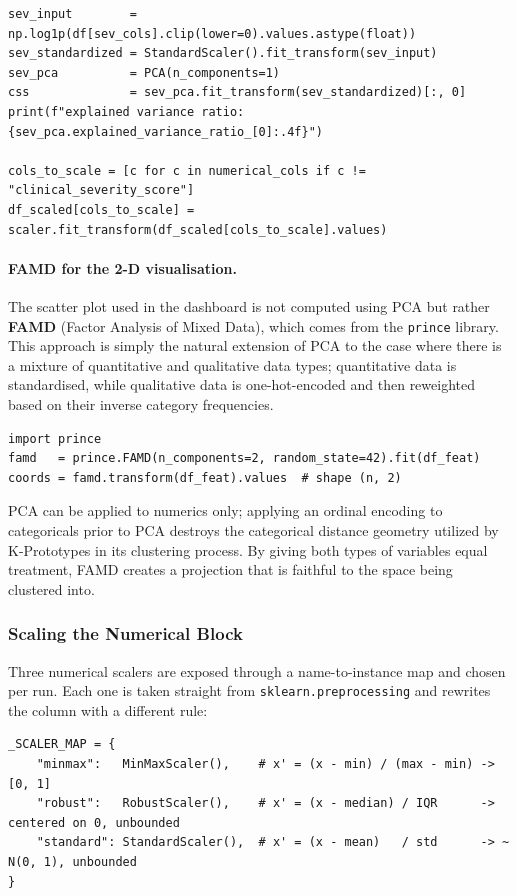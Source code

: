 \begin{lstlisting}[style=pythonstyle]
sev_input        = np.log1p(df[sev_cols].clip(lower=0).values.astype(float))
sev_standardized = StandardScaler().fit_transform(sev_input)
sev_pca          = PCA(n_components=1)
css              = sev_pca.fit_transform(sev_standardized)[:, 0]
print(f"explained variance ratio: {sev_pca.explained_variance_ratio_[0]:.4f}")

cols_to_scale = [c for c in numerical_cols if c != "clinical_severity_score"]
df_scaled[cols_to_scale] = scaler.fit_transform(df_scaled[cols_to_scale].values)
\end{lstlisting}

\paragraph{FAMD for the 2-D visualisation.} The scatter plot used in the dashboard is not computed using PCA but rather \textbf{FAMD} (Factor Analysis of Mixed Data), which comes from the \texttt{prince} library. This approach is simply the natural extension of PCA to the case where there is a mixture of quantitative and qualitative data types; quantitative data is standardised, while qualitative data is one-hot-encoded and then reweighted based on their inverse category frequencies.

\begin{lstlisting}[style=pythonstyle]
import prince
famd   = prince.FAMD(n_components=2, random_state=42).fit(df_feat)
coords = famd.transform(df_feat).values  # shape (n, 2)
\end{lstlisting}

PCA can be applied to numerics only; applying an ordinal encoding to categoricals prior to PCA destroys the categorical distance geometry utilized by K-Prototypes in its clustering process. By giving both types of variables equal treatment, FAMD creates a projection that is faithful to the space being clustered into.

\subsubsection*{Scaling the Numerical Block}

Three numerical scalers are exposed through a name-to-instance map and chosen per run. Each one is taken straight from \texttt{sklearn.preprocessing} and rewrites the column with a different rule:

\begin{lstlisting}[style=pythonstyle]
_SCALER_MAP = {
    "minmax":   MinMaxScaler(),    # x' = (x - min) / (max - min) -> [0, 1]
    "robust":   RobustScaler(),    # x' = (x - median) / IQR      -> centered on 0, unbounded
    "standard": StandardScaler(),  # x' = (x - mean)   / std      -> ~ N(0, 1), unbounded
}
\end{lstlisting}

